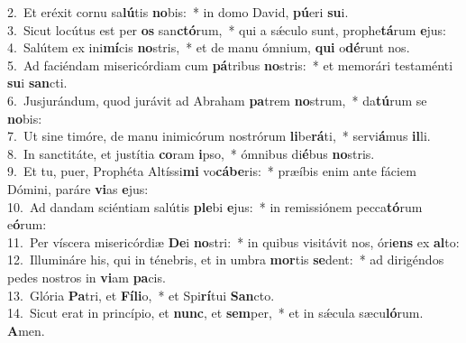 {2.~}Et eréxit cornu sa\textbf{lú}tis \textbf{no}bis:~* in domo David, \textbf{pú}eri \textbf{su}i.\\
{3.~}Sicut locútus est per \textbf{os} san\textbf{ctó}rum,~* qui a sǽculo sunt, prophe\textbf{tá}rum \textbf{e}jus:\\
{4.~}Salútem ex ini\textbf{mí}cis \textbf{no}stris,~* et de manu ómnium, \textbf{qui} o\textbf{dé}runt nos.\\
{5.~}Ad faciéndam misericórdiam cum \textbf{pá}tribus \textbf{no}stris:~* et memorári testaménti \textbf{su}i \textbf{san}cti.\\
{6.~}Jusjurándum, quod jurávit ad Abraham \textbf{pa}trem \textbf{no}strum,~* da\textbf{tú}rum se \textbf{no}bis:\\
{7.~}Ut sine timóre, de manu inimicórum nostrórum \textbf{li}be\textbf{rá}ti,~* servi\textbf{á}mus \textbf{il}li.\\
{8.~}In sanctitáte, et justítia \textbf{co}ram \textbf{i}pso,~* ómnibus di\textbf{é}bus \textbf{no}stris.\\
{9.~}Et tu, puer, Prophéta Altíssi\textbf{mi} vo\textbf{cá}\textbf{be}ris:~* præíbis enim ante fáciem Dómini, paráre \textbf{vi}as \textbf{e}jus:\\
{10.~}Ad dandam sciéntiam salútis \textbf{ple}bi \textbf{e}jus:~* in remissiónem pecca\textbf{tó}rum e\textbf{ó}rum:\\
{11.~}Per víscera misericórdiæ \textbf{De}i \textbf{no}stri:~* in quibus visitávit nos, óri\textbf{ens} ex \textbf{al}to:\\
{12.~}Illumináre his, qui in ténebris, et in umbra \textbf{mor}tis \textbf{se}dent:~* ad dirigéndos pedes nostros in \textbf{vi}am \textbf{pa}cis.\\
{13.~}Glória \textbf{Pa}tri, et \textbf{Fí}\textbf{li}o,~* et Spi\textbf{rí}tui \textbf{San}cto.\\
{14.~}Sicut erat in princípio, et \textbf{nunc}, et \textbf{sem}per,~* et in sǽcula sæcu\textbf{ló}rum. \textbf{A}men.\\
